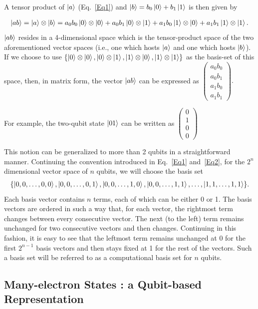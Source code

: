 \documentclass[12pt,oneside]{book}
\begin{document}
A tensor product of $\ket{a}$ (Eq.~\ref{Eq1}) and $\ket{b}=b_0\ket{0}+b_1\ket{1}$ is then given by

\begin{align}\label{Eq2}
    \ket{ab}=\ket{a}\otimes\ket{b}=a_0b_0 \ket{0}\otimes\ket{0} + a_0b_1 \ket{0}\otimes\ket{1} +a_1b_0 \ket{1}\otimes\ket{0} + a_1b_1\ket{1}\otimes\ket{1}.
\end{align}
$\ket{ab}$ resides in a 4-dimensional space which is the tensor-product space of the two aforementioned vector spaces (i.e., one which hosts $\ket{a}$ and one which hosts $\ket{b}$). If we choose to use $\{\ket{0}\otimes\ket{0} , \ket{0}\otimes\ket{1}, \ket{1}\otimes\ket{0}, \ket{1}\otimes\ket{1}\}$ as the basis-set of this space, then, in matrix form, the vector $\ket{ab}$ can be expressed as $\begin{pmatrix}
    a_0b_0\\
    a_0b_1\\
    a_1b_0\\
    a_1b_1
\end{pmatrix}.$

For example, the two-qubit state $\ket{01}$ can be written as $\begin{pmatrix}
    0\\
    1\\
    0\\
    0
\end{pmatrix}$

This notion can be generalized to more than 2 qubits in a straightforward manner. Continuing the convention introduced in Eq.~\ref{Eq1} and~\ref{Eq2}, for the $2^n$ dimensional vector space of $n$ qubits, we will choose the basis set
\begin{align*}
\{\ket{0,0,\hdots,0,0} , \ket{0,0,\hdots,0,1} , \ket{0,0,\hdots,1,0}, \ket{0,0,\hdots,1,1},\hdots ,\ket{1,1,\hdots,1,1} \}.
\end{align*}
Each basis vector contains $n$ terms, each of which can be either 0 or 1. The basis vectors are ordered in such a way that, for each vector, the rightmost term changes between every consecutive vector. The next (to the left) term remains unchanged for two consecutive vectors and then changes. Continuing in this fashion, it is easy to see that the leftmost term remains unchanged at 0 for the first $2^{n-1}$ basis vectors and then stays fixed at 1 for the rest of the vectors. Such a basis set will be referred to as a computational basis set for $n$ qubits.

\subsection*{Many-electron States : a Qubit-based Representation}
\end{document}
